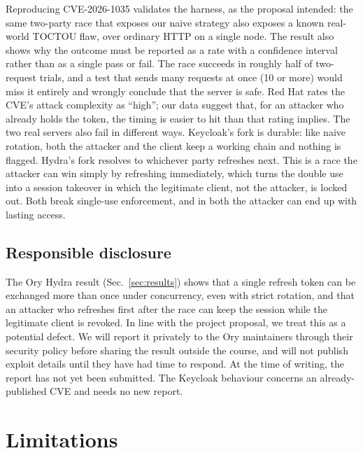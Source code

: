 \documentclass[conference]{IEEEtran}
\begin{document}
Reproducing CVE-2026-1035 validates the harness, as the proposal
intended: the same two-party race that exposes our naive strategy also
exposes a known real-world TOCTOU flaw, over ordinary HTTP on a single
node. The result also shows why the outcome must be reported as a rate
with a confidence interval rather than as a single pass or fail. The race
succeeds in roughly half of two-request trials, and a test that sends
many requests at once (10 or more) would miss it entirely and wrongly
conclude that the server is safe. Red Hat rates the CVE's attack
complexity as ``high''; our data suggest that, for an attacker who already
holds the token, the timing is easier to hit than that rating implies.
The two real servers also fail in different ways. Keycloak's fork is
durable: like naive rotation, both the attacker and the client keep a
working chain and nothing is flagged. Hydra's fork resolves to whichever
party refreshes next. This is a race the attacker can win simply by
refreshing immediately, which turns the double use into a session
takeover in which the legitimate client, not the attacker, is locked out.
Both break single-use enforcement, and in both the attacker can end up
with lasting access.

\subsection{Responsible disclosure}

The Ory Hydra result (Sec.~\ref{sec:results}) shows that a single refresh
token can be exchanged more than once under concurrency, even with strict
rotation, and that an attacker who refreshes first after the race can keep
the session while the legitimate client is revoked. In line with the project proposal, we treat this as a potential
defect. We will report it privately to the Ory maintainers through their
security policy before sharing the result outside the course, and will not
publish exploit details until they have had time to respond. At the time
of writing, the report has not yet been submitted. The Keycloak
behaviour concerns an already-published CVE and needs no new report.

\section{Limitations}
\end{document}
